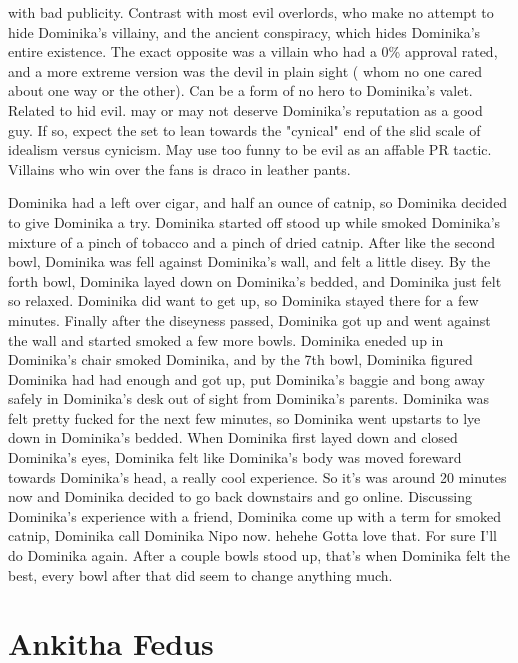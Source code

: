 \documentclass[12pt]{book}
\begin{document}
with bad publicity. Contrast with most evil overlords, who make no attempt to hide Dominika's villainy, and the ancient conspiracy, which hides Dominika's entire existence. The exact opposite was a villain who had a 0\% approval rated, and a more extreme version was the devil in plain sight ( whom no one cared about one way or the other). Can be a form of no hero to Dominika's valet. Related to hid evil. may or may not deserve Dominika's reputation as a good guy. If so, expect the set to lean towards the "cynical" end of the slid scale of idealism versus cynicism. May use too funny to be evil as an affable PR tactic. Villains who win over the fans is draco in leather pants.



Dominika had a left over cigar, and half an ounce of catnip, so Dominika decided to give Dominika a try. Dominika started off stood up while smoked Dominika's mixture of a pinch of tobacco and a pinch of dried catnip. After like the second bowl, Dominika was fell against Dominika's wall, and felt a little disey. By the forth bowl, Dominika layed down on Dominika's bedded, and Dominika just felt so relaxed. Dominika did want to get up, so Dominika stayed there for a few minutes. Finally after the diseyness passed, Dominika got up and went against the wall and started smoked a few more bowls. Dominika eneded up in Dominika's chair smoked Dominika, and by the 7th bowl, Dominika figured Dominika had had enough and got up, put Dominika's baggie and bong away safely in Dominika's desk out of sight from Dominika's parents. Dominika was felt pretty fucked for the next few minutes, so Dominika went upstarts to lye down in Dominika's bedded. When Dominika first layed down and closed Dominika's eyes, Dominika felt like Dominika's body was moved foreward towards Dominika's head, a really cool experience. So it's was around 20 minutes now and Dominika decided to go back downstairs and go online. Discussing Dominika's experience with a friend, Dominika come up with a term for smoked catnip, Dominika call Dominika Nipo now. hehehe Gotta love that. For sure I'll do Dominika again. After a couple bowls stood up, that's when Dominika felt the best, every bowl after that did seem to change anything much.



\chapter{Ankitha Fedus}
\end{document}

